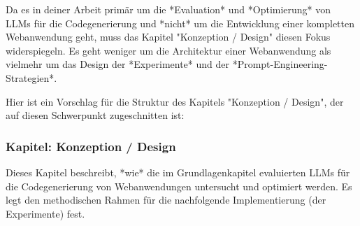 Da es in deiner Arbeit primär um die *Evaluation* und *Optimierung* von LLMs für die Codegenerierung und *nicht* um die Entwicklung einer kompletten Webanwendung geht, muss das Kapitel "Konzeption / Design" diesen Fokus widerspiegeln. Es geht weniger um die Architektur einer Webanwendung als vielmehr um das Design der *Experimente* und der *Prompt-Engineering-Strategien*.

Hier ist ein Vorschlag für die Struktur des Kapitels "Konzeption / Design", der auf diesen Schwerpunkt zugeschnitten ist:

\subsubsection{Kapitel: Konzeption / Design}

Dieses Kapitel beschreibt, *wie* die im Grundlagenkapitel evaluierten LLMs für die Codegenerierung von Webanwendungen untersucht und optimiert werden. Es legt den methodischen Rahmen für die nachfolgende Implementierung (der Experimente) fest.





